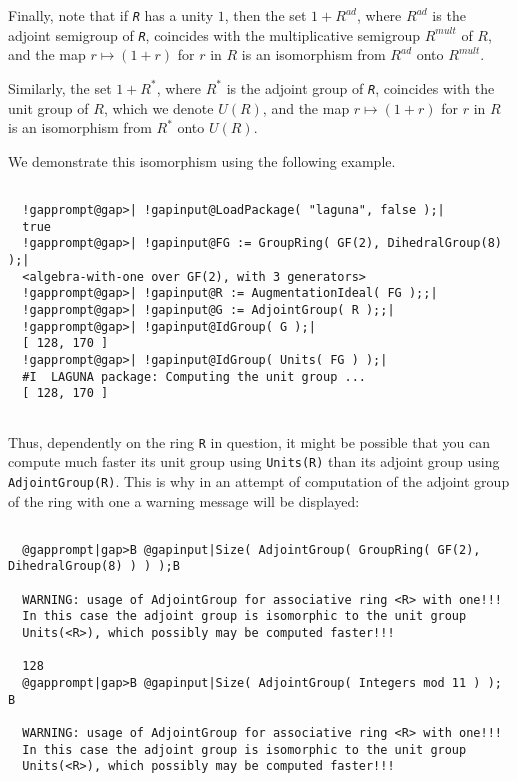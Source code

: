 \documentclass[a4paper,11pt]{report}
\begin{document}
{{{\begin{Verbatim}[commandchars=!@|,fontsize=\small,frame=single,label=Example]
\end{Verbatim}
 Finally, note that if \mbox{\texttt{\mdseries\slshape R}} has a unity $1$, then the set $1+R^{ad}$, where $R^{ad}$ is the adjoint semigroup of \mbox{\texttt{\mdseries\slshape R}}, coincides with the multiplicative semigroup $R^{mult}$ of $R$, and the map $ r \mapsto (1+r) $ for $r$ in $R$ is an isomorphism from $R^{ad}$ onto $R^{mult}$. 

 Similarly, the set $1+R^*$, where $R^{*}$ is the adjoint group of \mbox{\texttt{\mdseries\slshape R}}, coincides with the unit group of $R$, which we denote $U(R)$, and the map $r \mapsto (1+r)$ for $r$ in $R$ is an isomorphism from $R^*$ onto $U(R)$. 

 We demonstrate this isomorphism using the following example. 
\begin{Verbatim}[commandchars=!@|,fontsize=\small,frame=single,label=Example]
  
  !gapprompt@gap>| !gapinput@LoadPackage( "laguna", false );|
  true
  !gapprompt@gap>| !gapinput@FG := GroupRing( GF(2), DihedralGroup(8) );|
  <algebra-with-one over GF(2), with 3 generators>
  !gapprompt@gap>| !gapinput@R := AugmentationIdeal( FG );;|
  !gapprompt@gap>| !gapinput@G := AdjointGroup( R );;|
  !gapprompt@gap>| !gapinput@IdGroup( G );|
  [ 128, 170 ]
  !gapprompt@gap>| !gapinput@IdGroup( Units( FG ) );|
  #I  LAGUNA package: Computing the unit group ...
  [ 128, 170 ]
  
\end{Verbatim}
 Thus, dependently on the ring \texttt{R} in question, it might be possible that you can compute much faster its unit
group using \texttt{Units(R)} than its adjoint group using \texttt{AdjointGroup(R)}. This is why in an attempt of computation of the adjoint group of the ring
with one a warning message will be displayed: 

 
\begin{Verbatim}[commandchars=@|B,fontsize=\small,frame=single,label=Example]
  
  @gapprompt|gap>B @gapinput|Size( AdjointGroup( GroupRing( GF(2), DihedralGroup(8) ) ) );B
  
  WARNING: usage of AdjointGroup for associative ring <R> with one!!! 
  In this case the adjoint group is isomorphic to the unit group 
  Units(<R>), which possibly may be computed faster!!! 
  
  128
  @gapprompt|gap>B @gapinput|Size( AdjointGroup( Integers mod 11 ) );                  B
  
  WARNING: usage of AdjointGroup for associative ring <R> with one!!! 
  In this case the adjoint group is isomorphic to the unit group 
  Units(<R>), which possibly may be computed faster!!! 
  

\end{Verbatim}}}}
\end{document}
